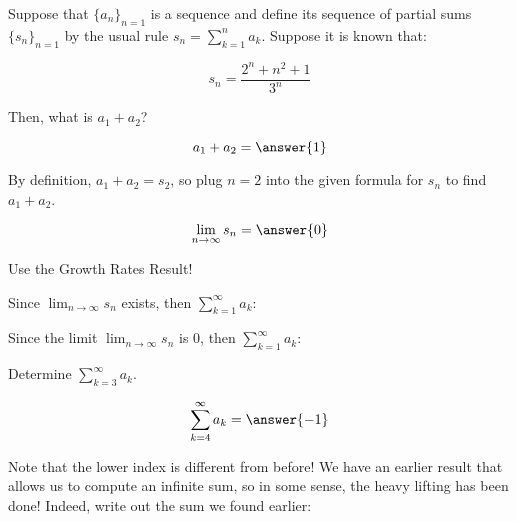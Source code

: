 \documentclass{ximera}
\author{Jim Talamo}
\begin{document}
\begin{exercise}
Suppose that $\{a_n\}_{n=1}$ is a sequence and define its sequence of partial sums $\{s_n\}_{n=1}$ by the usual rule $s_n = \sum_{k=1}^n a_k$.  Suppose it is known that:

\[
s_n = \frac{2^n+n^2+1}{3^n}
\]

Then, what is $a_1+a_2$?

\[
a_1+a_2= \answer{1}
\]
\begin{hint}
By definition, $a_1+a_2 = s_2$, so plug $n=2$ into the given formula for $s_n$ to find $a_1+a_2$.
\end{hint}
\begin{exercise}
\[
\lim_{n \to \infty} s_n = \answer{0}
\]
\begin{hint}
Use the Growth Rates Result!
\end{hint}
\begin{exercise}
Since $\lim_{n \to \infty} s_n$ exists, then $\sum_{k=1}^{\infty} a_k$:


\begin{multipleChoice}
\end{multipleChoice}

Since the limit $\lim_{n \to \infty} s_n$ is $0$, then $\sum_{k=1}^{\infty} a_k$:
\begin{multipleChoice}
\end{multipleChoice}

\begin{exercise}
Determine $\sum_{k=3}^{\infty} a_k$.

\[
\sum_{k=4}^{\infty} a_k = \answer{-1}
\]

\begin{hint}
Note that the lower index is different from before!  We have an earlier result that allows us to compute an infinite sum, so in some sense, the heavy lifting has been done!  Indeed, write out the sum we found earlier:
\begin{image}
  \end{image}
\end{hint}


\end{exercise}
\end{exercise}
\end{exercise}
\end{exercise}
\end{document}
